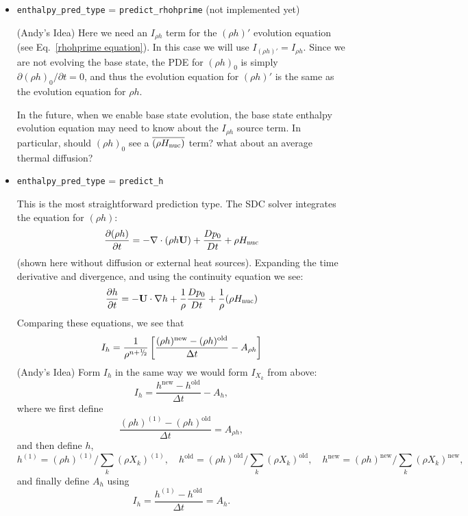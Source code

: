 \begin{itemize}
\item {\tt enthalpy\_pred\_type} = {\tt predict\_rhohprime} (not implemented yet)

(Andy's Idea) Here we need an $I_{\rho h}$ term for the $(\rho h)'$ evolution
equation (see Eq.~\ref{rhohprime equation}).  In this case we will use
$I_{(\rho h)'} = I_{\rho h}$.  Since we are not evolving the base state, the PDE
for $(\rho h)_0$ is simply $\partial(\rho h)_0/\partial t = 0$, and thus the
evolution equation for $(\rho h)'$ is the same as the evolution equation
for $\rho h$.

In the future, when we enable base state evolution, the base state enthalpy
evolution equation may need to know about the $I_{\rho h}$ source term.
In particular, should $(\rho h)_0$ see a $\overline{(\rho {H_{\rm nuc}})}$ term?
what about an average thermal diffusion?

\item {\tt enthalpy\_pred\_type} = {\tt predict\_h} 

This is the most straightforward prediction type.  The SDC solver
integrates the equation for $(\rho h)$:
\begin{equation}
\frac{\partial(\rho h)}{\partial t} = -\nabla\cdot(\rho h {\bf U}) + \frac{Dp_0}{Dt}  + \rho H_{\rm nuc} 
\end{equation}
(shown here without diffusion or external heat sources).  Expanding
the time derivative and divergence, and using the continuity equation
we see:
\begin{equation}
\frac{\partial h}{\partial t} = -{\bf U} \cdot \nabla h + \frac{1}{\rho} \frac{Dp_0}{Dt}  + \frac{1}{\rho} (\rho H_{\rm nuc}) \label{eq:sdc:h}
\end{equation}
Comparing these equations, we see that 
\begin{equation}
I_{h}  = \frac{1}{\rho^{n+\myhalf}} \left [
    \frac{(\rho h)^\mathrm{new} - (\rho h)^\mathrm{old}}{\Delta t} - A_{\rho h} \right ]
\end{equation}
(Andy's Idea) Form $I_h$ in the same way we would form $I_{X_k}$ from above:
\begin{equation}
I_h = \frac{h^\mathrm{new} - h^\mathrm{old}}{\Delta t} - A_h,
\end{equation}
where we first define
\begin{equation}
\frac{(\rho h)^{(1)} - (\rho h)^\mathrm{old}}{\Delta t} = A_{\rho h},
\end{equation}
and then define $h$,
\begin{equation}
h^{(1)} = (\rho h)^{(1)} / \sum_k(\rho X_k)^{(1)}, \quad h^\mathrm{old} = (\rho h)^\mathrm{old} / \sum_k(\rho X_k)^\mathrm{old}, \quad h^\mathrm{new} = (\rho h)^\mathrm{new} / \sum_k(\rho X_k)^\mathrm{new},
\end{equation}
and finally define $A_h$ using
\begin{equation}
I_h = \frac{h^{(1)} - h^\mathrm{old}}{\Delta t} = A_h.
\end{equation}


\end{itemize}
